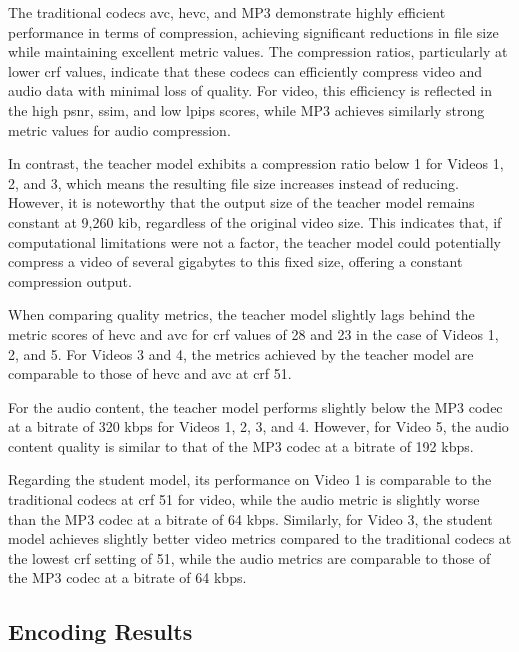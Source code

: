 \documentclass{ioereport}
\begin{document}
    The traditional codecs \gls{avc}, \gls{hevc}, and MP3 demonstrate highly efficient performance in terms of compression, achieving significant reductions in file size while maintaining excellent metric values. The compression ratios, particularly at lower \gls{crf} values, indicate that these \gls{codec}s can efficiently compress video and audio data with minimal loss of quality. For video, this efficiency is reflected in the high \gls{psnr}, \gls{ssim}, and low \gls{lpips} scores, while MP3 achieves similarly strong metric values for audio compression.

    In contrast, the teacher model exhibits a compression ratio below 1 for Videos 1, 2, and 3, which means the resulting file size increases instead of reducing. However, it is noteworthy that the output size of the teacher model remains constant at 9,260 \gls{kib}, regardless of the original video size. This indicates that, if computational limitations were not a factor, the teacher model could potentially compress a video of several gigabytes to this fixed size, offering a constant compression output.

    When comparing quality metrics, the teacher model slightly lags behind the metric scores of \gls{hevc} and \gls{avc} for \gls{crf} values of 28 and 23 in the case of Videos 1, 2, and 5. For Videos 3 and 4, the metrics achieved by the teacher model are comparable to those of \gls{hevc} and \gls{avc} at \gls{crf} 51.

    For the audio content, the teacher model performs slightly below the MP3 codec at a bitrate of 320 \gls{kbps} for Videos 1, 2, 3, and 4. However, for Video 5, the audio content quality is similar to that of the MP3 codec at a bitrate of 192 \gls{kbps}.

    Regarding the student model, its performance on Video 1 is comparable to the traditional codecs at \gls{crf} 51 for video, while the audio metric is slightly worse than the MP3 codec at a bitrate of 64 \gls{kbps}. Similarly, for Video 3, the student model achieves slightly better video metrics compared to the traditional codecs at the lowest \gls{crf} setting of 51, while the audio metrics are comparable to those of the MP3 codec at a bitrate of 64 \gls{kbps}.

    
    
    \subsection{Encoding Results}
    
\end{document}
